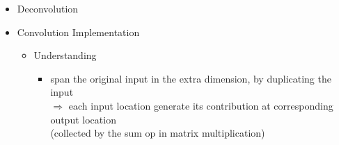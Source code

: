 \begin{itemize}
\item Deconvolution


\item Convolution Implementation
	\begin{itemize}
	\item Understanding
		\begin{itemize}
		\item span the original input in the extra dimension, by duplicating the input \\
		$\Rightarrow$ each input location generate its contribution at corresponding output location \\
		(collected by the sum op in matrix multiplication)
		\end{itemize}
	\end{itemize}
\end{itemize}

